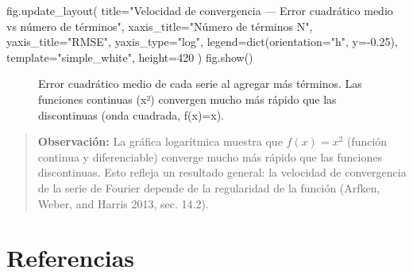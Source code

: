 \documentclass[
  letterpaper,
  DIV=11,
  numbers=noendperiod]{scrreprt}
\newenvironment{Shaded}{\begin{snugshade}}{\end{snugshade}}
\newcommand{\BuiltInTok}[1]{\textcolor[rgb]{0.00,0.23,0.31}{#1}}
\newcommand{\DecValTok}[1]{\textcolor[rgb]{0.68,0.00,0.00}{#1}}
\newcommand{\FloatTok}[1]{\textcolor[rgb]{0.68,0.00,0.00}{#1}}
\newcommand{\NormalTok}[1]{\textcolor[rgb]{0.00,0.23,0.31}{#1}}
\newcommand{\OperatorTok}[1]{\textcolor[rgb]{0.37,0.37,0.37}{#1}}
\newcommand{\StringTok}[1]{\textcolor[rgb]{0.13,0.47,0.30}{#1}}
\begin{document}
\begin{Shaded}
\begin{Highlighting}[]
\NormalTok{fig.update\_layout(}
\NormalTok{    title}\OperatorTok{=}\StringTok{"Velocidad de convergencia — Error cuadrático medio vs número de términos"}\NormalTok{,}
\NormalTok{    xaxis\_title}\OperatorTok{=}\StringTok{"Número de términos N"}\NormalTok{,}
\NormalTok{    yaxis\_title}\OperatorTok{=}\StringTok{"RMSE"}\NormalTok{,}
\NormalTok{    yaxis\_type}\OperatorTok{=}\StringTok{"log"}\NormalTok{,}
\NormalTok{    legend}\OperatorTok{=}\BuiltInTok{dict}\NormalTok{(orientation}\OperatorTok{=}\StringTok{"h"}\NormalTok{, y}\OperatorTok{={-}}\FloatTok{0.25}\NormalTok{),}
\NormalTok{    template}\OperatorTok{=}\StringTok{"simple\_white"}\NormalTok{,}
\NormalTok{    height}\OperatorTok{=}\DecValTok{420}
\NormalTok{)}
\NormalTok{fig.show()}
\end{Highlighting}
\end{Shaded}

\begin{figure}


\caption{\label{fig-convergencia}Error cuadrático medio de cada serie al
agregar más términos. Las funciones continuas (x²) convergen mucho más
rápido que las discontinuas (onda cuadrada, f(x)=x).}

\end{figure}%

\begin{quote}
\textbf{Observación:} La gráfica logarítmica muestra que \(f(x)=x^2\)
(función continua y diferenciable) converge mucho más rápido que las
funciones discontinuas. Esto refleja un resultado general: la velocidad
de convergencia de la serie de Fourier depende de la regularidad de la
función (Arfken, Weber, and Harris 2013, sec. 14.2).
\end{quote}

\chapter*{Referencias}\label{referencias}

\end{document}
